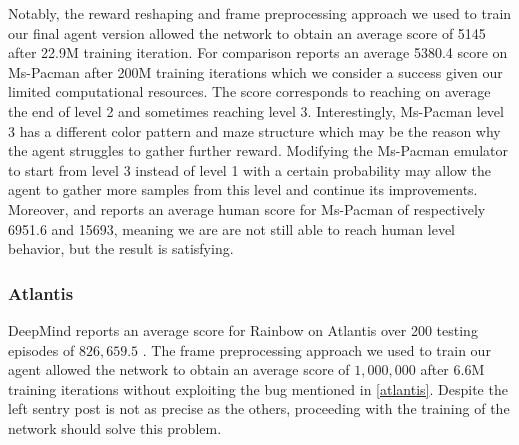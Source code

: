 \documentclass[10pt,twocolumn,letterpaper]{article}
\begin{document}
Notably, the reward reshaping and frame preprocessing approach we used to train our final agent version allowed the network to obtain an average score of 5145 after 22.9M training iteration. For comparison \cite{DBLP:journals/corr/abs-1710-02298} reports an average 5380.4 score on Ms-Pacman after 200M training iterations which we consider a success given our limited computational resources.
The score corresponds to reaching on average the end of level 2 and sometimes reaching level 3. Interestingly, Ms-Pacman level 3 has a different color pattern and maze structure which may be the reason why the agent struggles to gather further reward. Modifying the Ms-Pacman emulator to start from level 3 instead of level 1 with a certain probability may allow the agent to gather more samples from this level and continue its improvements.
Moreover, \cite{DBLP:journals/corr/WangFL15} and \cite{humancontrol} reports an average human score for Ms-Pacman of respectively 6951.6 and 15693, meaning we are are not still able to reach human level behavior, but the result is satisfying.

\subsubsection{Atlantis}
DeepMind reports an average score for Rainbow on Atlantis over 200 testing episodes of $826,659.5$ \cite{DBLP:journals/corr/abs-1710-02298}. The frame preprocessing approach we used to train our agent allowed the network to obtain an average score of $1,000,000$ after $6.6$M training iterations without exploiting the bug mentioned in \ref{atlantis}. Despite the left sentry post is not as precise as the others,  proceeding with the training of the network should solve this problem. 

{\small


}
\end{document}
